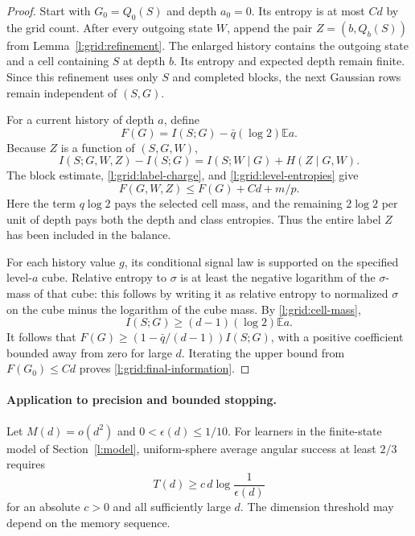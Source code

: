 \begin{proof}
Start with $G_0=Q_0(S)$ and depth $a_0=0$.  Its entropy is at most $Cd$
by the grid count.  After every outgoing state $W$, append the pair
$Z=(b,Q_b(S))$ from Lemma~\ref{l:grid:refinement}.  The enlarged history
contains the outgoing state and a cell containing $S$ at depth $b$.
Its entropy and expected depth remain finite.  Since this refinement
uses only $S$ and completed blocks, the next Gaussian rows remain
independent of $(S,G)$.

For a current history of depth $a$, define
\[
 F(G)=I(S;G)-\bar q(\log2)\mathbb E a.
\]
Because $Z$ is a function of $(S,G,W)$,
\[
 I(S;G,W,Z)-I(S;G)=I(S;W\mid G)+H(Z\mid G,W).
\]
The block estimate, \eqref{l:grid:label-charge}, and
\eqref{l:grid:level-entropies} give
\[
 F(G,W,Z)\le F(G)+Cd+m/p.
\]
Here the term $q\log2$ pays the selected cell mass, and the remaining
$2\log2$ per unit of depth pays both the depth and class entropies.
Thus the entire label $Z$ has been included in the balance.

For each history value $g$, its conditional signal law is supported
on the specified level-$a$ cube.  Relative entropy to $\sigma$ is at
least the negative logarithm of the $\sigma$-mass of that cube: this
follows by writing it as relative entropy to normalized $\sigma$ on
the cube minus the logarithm of the cube mass.  By
\eqref{l:grid:cell-mass},
\[
 I(S;G)\ge(d-1)(\log2)\mathbb E a.
\]
It follows that
$F(G)\ge(1-\bar q/(d-1))I(S;G)$, with a positive coefficient bounded
away from zero for large $d$.  Iterating the upper bound from
$F(G_0)\le Cd$ proves \eqref{l:grid:final-information}.
\end{proof}

\paragraph{Application to precision and bounded stopping.}
\begin{corollary}
\label{l:grid:precision}
Let $M(d)=o(d^2)$ and $0<\epsilon(d)\le1/10$.  For learners in the
finite-state model of Section~\ref{l:model}, uniform-sphere average
angular success at least $2/3$ requires
\[
 T(d)\ge c\,d\log\frac1{\epsilon(d)}
\]
for an absolute $c>0$ and all sufficiently large $d$.  The dimension
threshold may depend on the memory sequence.
\end{corollary}

